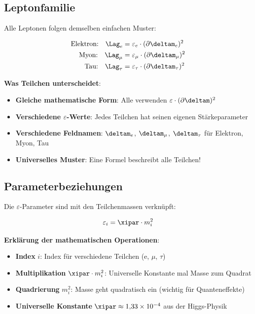	\subsection{Leptonfamilie}
	
	Alle Leptonen folgen demselben einfachen Muster:
	
	\begin{align}
		\text{Elektron:} \quad \Lag_e &= \varepsilon_e \cdot (\partial \deltam_e)^2 \\
		\text{Myon:} \quad \Lag_{\mu} &= \varepsilon_{\mu} \cdot (\partial \deltam_{\mu})^2 \\
		\text{Tau:} \quad \Lag_{\tau} &= \varepsilon_{\tau} \cdot (\partial \deltam_{\tau})^2
	\end{align}
	
	\textbf{Was Teilchen unterscheidet}:
	\begin{itemize}
		\item \textbf{Gleiche mathematische Form}: Alle verwenden $\varepsilon \cdot (\partial \deltam)^2$
		\item \textbf{Verschiedene $\varepsilon$-Werte}: Jedes Teilchen hat seinen eigenen Stärkeparameter
		\item \textbf{Verschiedene Feldnamen}: $\deltam_e$, $\deltam_{\mu}$, $\deltam_{\tau}$ für Elektron, Myon, Tau
		\item \textbf{Universelles Muster}: Eine Formel beschreibt alle Teilchen!
	\end{itemize}
	
	\subsection{Parameterbeziehungen}
	
	Die $\varepsilon$-Parameter sind mit den Teilchenmassen verknüpft:
	
	\begin{equation}
		\varepsilon_i = \xipar \cdot m_i^2
		\label{eq:epsilon_mass_relation}
	\end{equation}
	
	\textbf{Erklärung der mathematischen Operationen}:
	\begin{itemize}
		\item \textbf{Index} $i$: Index für verschiedene Teilchen (e, $\mu$, $\tau$)
		\item \textbf{Multiplikation} $\xipar \cdot m_i^2$: Universelle Konstante mal Masse zum Quadrat
		\item \textbf{Quadrierung} $m_i^2$: Masse geht quadratisch ein (wichtig für Quanteneffekte)
		\item \textbf{Universelle Konstante} $\xipar \approx 1{,}33 \times 10^{-4}$ aus der Higgs-Physik
	\end{itemize}
	
